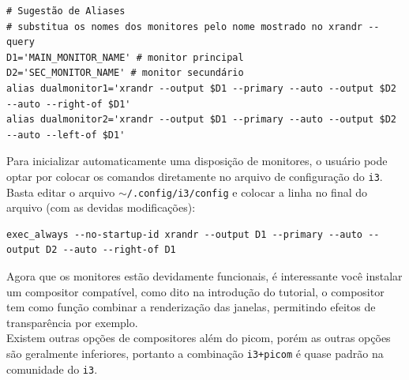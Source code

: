 \documentclass[12pt,a4paper]{article}
\begin{document}
\newpage

\begin{lstlisting}
# Sugestão de Aliases
# substitua os nomes dos monitores pelo nome mostrado no xrandr --query
D1='MAIN_MONITOR_NAME' # monitor principal
D2='SEC_MONITOR_NAME' # monitor secundário
alias dualmonitor1='xrandr --output $D1 --primary --auto --output $D2 --auto --right-of $D1'
alias dualmonitor2='xrandr --output $D1 --primary --auto --output $D2 --auto --left-of $D1'
\end{lstlisting}

\vspace{\baselineskip}

Para inicializar automaticamente uma disposição de monitores, o usuário pode optar por colocar os comandos diretamente no arquivo de configuração do \texttt{i3}. Basta editar o arquivo \texttt{$\sim$/.config/i3/config} e colocar a linha no final do arquivo (com as devidas modificações): \\

\begin{lstlisting}
exec_always --no-startup-id xrandr --output D1 --primary --auto --output D2 --auto --right-of D1
\end{lstlisting}

\vspace{\baselineskip}

Agora que os monitores estão devidamente funcionais, é interessante você instalar um compositor compatível, como dito na introdução do tutorial, o compositor tem como função combinar a renderização das janelas, permitindo efeitos de transparência por exemplo. \\

Existem outras opções de compositores além do picom, porém as outras opções são geralmente inferiores, portanto a combinação \texttt{i3+picom} é quase padrão na comunidade do \texttt{i3}. \\
\end{document}
